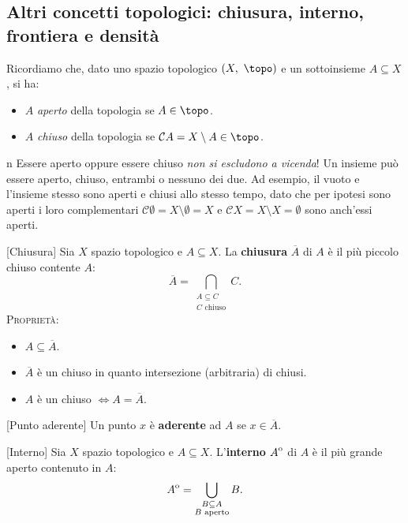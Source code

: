 \subsection{Altri concetti topologici: chiusura, interno, frontiera e densità}
Ricordiamo che, dato uno spazio topologico $\left(X,\ \topo\right)$ e un sottoinsieme $A\subseteq X$, si ha:
\begin{itemize}
\item $A$ \textit{aperto} della topologia se $A\in\topo$.
\item $A$ \textit{chiuso} della topologia se $\mathcal{C}A=X\setminus A\in\topo$.
\end{itemize}
\begin{warning}{n}
Essere aperto oppure essere chiuso \textit{non si escludono a vicenda}! Un insieme può essere aperto, chiuso, entrambi o nessuno dei due. Ad esempio, il vuoto e l'insieme stesso sono aperti e chiusi allo stesso tempo, dato che per ipotesi sono aperti i loro complementari $\mathcal{C}\emptyset = X\setminus \emptyset = X$ e $\mathcal{C}X = X\setminus X = \emptyset$ sono anch'essi aperti.
\end{warning}
\begin{definition}{}[Chiusura]
Sia $X$ spazio topologico e $A\subseteq X$. La \textbf{chiusura} $\overline{A}$ di $A$ è il più piccolo chiuso contente $A$:
\begin{equation*}
\overline{A}=\bigcap_{\substack{A\subseteq C\\C\text{ chiuso}}}C.
\end{equation*}
\textsc{Proprietà:}
\begin{itemize}
\item $A\subseteq \overline{A}$.
\item $\overline{A}$ è un chiuso in quanto intersezione (arbitraria) di chiusi.
\item $A$ è un chiuso $\iff A=\overline{A}$.
\end{itemize}
\end{definition}
\begin{definition}{}[Punto aderente]
Un punto $x$ è \textbf{aderente} ad $A$ se $x\in\overline{A}$.
\end{definition}
\begin{definition}{}[Interno]
Sia $X$ spazio topologico e $A\subseteq X$. L'\textbf{interno} ${\kern0ptA}^{\mathrm{o}}$ di $A$ è il più grande aperto contenuto in $A$:
\begin{equation*}
	{\kern0ptA}^{\mathrm{o}}=\bigcup_{\substack{B\subseteq A\\B\text{ aperto}}}B.
\end{equation*}
\end{definition}

